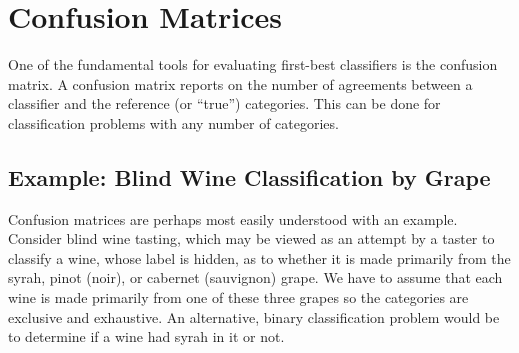 \section{Confusion Matrices}\label{section:classifier-eval-confusion-matrix}

One of the fundamental tools for evaluating first-best classifiers is
the confusion matrix.  A confusion matrix reports on the number of
agreements between a classifier and the reference (or ``true'')
categories.  This can be done for classification problems with any
number of categories.

\subsection{Example: Blind Wine Classification by Grape}

Confusion matrices are perhaps most easily understood with an example.
Consider blind wine tasting, which may be viewed as an attempt by a
taster to classify a wine, whose label is hidden, as to whether it is
made primarily from the syrah, pinot (noir), or cabernet (sauvignon)
grape.  We have to assume that each wine is made primarily from one of
these three grapes so the categories are exclusive and exhaustive.  An
alternative, binary classification problem would be to determine if
a wine had syrah in it or not.

